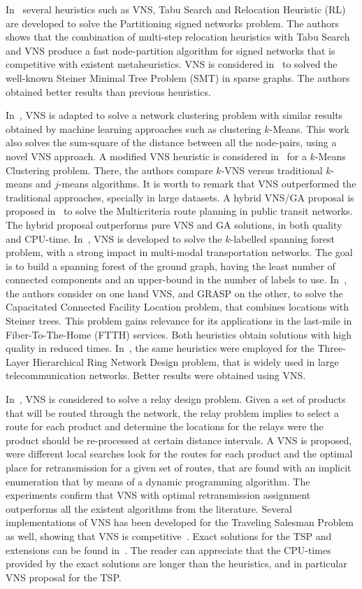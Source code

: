 In~\cite{88} several heuristics such as VNS, Tabu Search and Relocation Heuristic (RL) are developed 
to solve the Partitioning signed networks problem. The authors shows that the combination of multi-step relocation heuristics with Tabu Search and VNS produce a fast node-partition algorithm for signed networks that 
is competitive with existent metaheuristics. 
VNS is considered in~\cite{89} to solved the well-known Steiner Minimal Tree Problem (SMT) in sparse graphs. The authors obtained better results than previous heuristics. 

In~\cite{90}, VNS is adapted to solve a network clustering problem with similar results obtained 
by machine learning approaches such as clustering $k$-Means. This work 
also solves the sum-square of the distance between all the node-pairs, using a novel VNS approach. 
A modified VNS heuristic is considered in~\cite{96} for a $k$-Means Clustering problem. There, the authors compare $k$-VNS versus traditional $k$-means and $j$-means algorithms. It is worth to remark that VNS outperformed the traditional approaches, specially in large datasets. 
A hybrid VNS/GA proposal is proposed in~\cite{91} to solve the Multicriteria route planning in public transit networks. The hybrid proposal outperforms pure VNS and GA solutions, in both quality and CPU-time. In~\cite{92}, VNS is developed to solve the $k$-labelled spanning forest problem, with a strong impact in multi-modal transportation networks. The goal is to build a spanning forest of the ground graph, having the least number of connected components and an upper-bound in the number of labels to use. In~\cite{93}, the authors consider on one hand VNS, and GRASP on the other, to solve the 
Capacitated Connected Facility Location problem, that combines locations with Steiner trees. This problem 
gains relevance for its applications in the last-mile in Fiber-To-The-Home (FTTH) services. Both heuristics  obtain solutions with high quality in reduced times. 
In~\cite{95}, the same heuristics were employed for the Three-Layer Hierarchical Ring Network Design problem, 
that is widely used in large telecommunication networks. Better results were obtained using VNS. 

In~\cite{97}, VNS is considered to solve a relay design problem. Given a set of products that will be routed through the network, the relay problem implies to select a route for each product and determine the locations for the relays were the product should be re-processed at certain distance intervals. A VNS is proposed, were different local searches look for the routes for each product and the optimal place for retransmission for a given set of routes, that are found with an implicit enumeration that by means of a dynamic programming algorithm. 
The experiments confirm that VNS with optimal retransmission assignment outperforms all the existent algorithms from the literature. Several implementations of VNS has been developed for the Traveling Salesman Problem as well,  showing that VNS is competitive~\cite{98}. Exact solutions for the TSP and extensions can be found in~\cite{61}. 
The reader can appreciate that the CPU-times provided by the exact solutions are longer than the heuristics, and 
in particular VNS proposal for the TSP.


